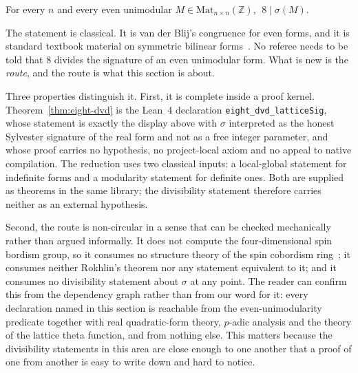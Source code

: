 \begin{theorem}
\label{thm:eight-dvd}
For every $n$ and every even unimodular $M \in
\mathrm{Mat}_{n\times n}(\mathbb{Z})$, $\;8 \mid \sigma(M)$.
\end{theorem}

The statement is classical. It is van der Blij's congruence for even
forms, and it is standard textbook material on symmetric bilinear
forms~\cite{vanderBlij1959,MilnorHusemoller1973}.
No referee needs to be told that $8$ divides the signature of an even
unimodular form. What is new is the \emph{route}, and the route is what
this section is about.

Three properties distinguish it. First, it is complete inside a proof
kernel. Theorem~\ref{thm:eight-dvd} is the Lean~4 declaration
\texttt{eight\_dvd\_latticeSig}, whose statement is exactly the display
above with $\sigma$ interpreted as the honest Sylvester signature of the
real form and not as a free integer parameter, and whose proof carries no
hypothesis, no project-local axiom and no appeal to native compilation.
The reduction uses two classical inputs: a local-global statement for
indefinite forms and a modularity statement for definite ones. Both are
supplied as theorems in the same library; the divisibility statement
therefore carries neither as an external hypothesis.

Second, the route is non-circular in a sense that can be checked
mechanically rather than argued informally. It does not compute the
four-dimensional spin bordism group, so it consumes no structure theory
of the spin cobordism ring~\cite{ABP1967}; it consumes neither Rokhlin's
theorem nor any statement equivalent to it; and it consumes no
divisibility statement about $\sigma$ at any point. The reader can
confirm this from the dependency graph rather than from our word for it:
every declaration named in this section is reachable from the
even-unimodularity predicate together with real quadratic-form theory,
$p$-adic analysis and the theory of the lattice theta function, and from
nothing else. This matters because the divisibility statements in this
area are close enough to one another that a proof of one from another is
easy to write down and hard to notice.

